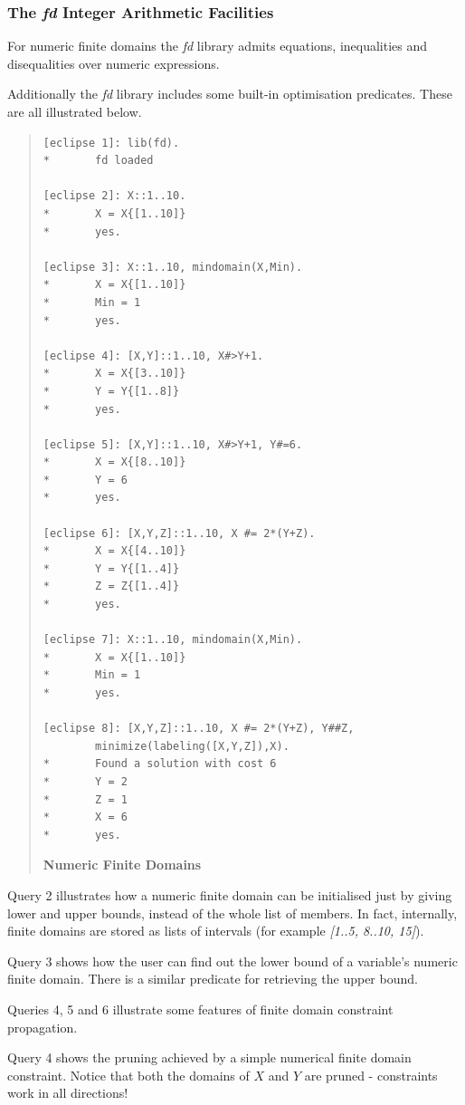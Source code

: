 \documentclass[a4wide]{article}
\begin{document}
\subsubsection{The {\em fd} Integer Arithmetic Facilities}
For numeric finite domains the {\em fd} library admits equations,
inequalities and disequalities over numeric expressions.

Additionally the {\em fd} library includes some built-in optimisation
predicates. 
These are all illustrated below.
\begin{quote}
\begin{verbatim}
[eclipse 1]: lib(fd).
*       fd loaded

[eclipse 2]: X::1..10.
*       X = X{[1..10]}
*       yes.

[eclipse 3]: X::1..10, mindomain(X,Min).
*       X = X{[1..10]}
*       Min = 1
*       yes.

[eclipse 4]: [X,Y]::1..10, X#>Y+1.
*       X = X{[3..10]}
*       Y = Y{[1..8]}
*       yes.

[eclipse 5]: [X,Y]::1..10, X#>Y+1, Y#=6.
*       X = X{[8..10]}
*       Y = 6
*       yes.

[eclipse 6]: [X,Y,Z]::1..10, X #= 2*(Y+Z).
*       X = X{[4..10]}
*       Y = Y{[1..4]}
*       Z = Z{[1..4]}
*       yes.

[eclipse 7]: X::1..10, mindomain(X,Min).
*       X = X{[1..10]}
*       Min = 1
*       yes.

[eclipse 8]: [X,Y,Z]::1..10, X #= 2*(Y+Z), Y##Z, 
        minimize(labeling([X,Y,Z]),X).
*       Found a solution with cost 6
*       Y = 2
*       Z = 1
*       X = 6
*       yes.

\end{verbatim}
{\bf Numeric Finite Domains}
\label{fdnum}
\end{quote}

Query 2 illustrates how a numeric finite domain can be initialised
just by giving lower and upper bounds, instead of the whole list of
members.
In fact, internally, finite domains are stored as lists of intervals
(for example {\em [1..5, 8..10, 15]}).

Query 3 shows how the user can find out the lower bound of a
variable's numeric finite domain. 
There is a similar predicate for retrieving the upper bound.

Queries 4, 5 and 6 illustrate some features of finite domain constraint
propagation.

Query 4 shows the pruning achieved by a simple numerical finite
domain constraint.
Notice that both the domains of $X$ and $Y$ are pruned - constraints
work in all directions!
\end{document}

